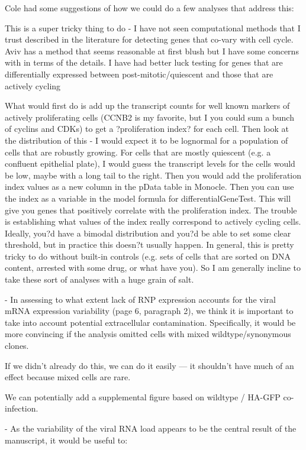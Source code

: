 \documentclass[11pt, oneside]{article}   	%
\begin{document}
{\color{red}
Cole had some suggestions of how we could do a few analyses that address this:

This is a super tricky thing to do - I have not seen computational methods that I trust described in the literature for detecting genes that co-vary with cell cycle. Aviv has a method that seems reasonable at first blush but I have some concerns with in terms of the details.
I have had better luck testing for genes that are differentially expressed between post-mitotic/quiescent and those that are actively cycling

What would first do is add up the transcript counts for well known markers of actively proliferating cells (CCNB2 is my favorite, but I you could sum a bunch of cyclins and CDKs) to get a ?proliferation index? for each cell. Then look at the distribution of this - I would expect it to be lognormal for a population of cells that are robustly growing. For cells that are mostly quiescent (e.g. a confluent epithelial plate), I would guess the transcript levels for the cells would be low, maybe with a long tail to the right. Then you would add the proliferation index values as a new column in the pData table in Monocle. Then you can use the index as a variable in the model formula for differentialGeneTest. This will give you genes that positively correlate with the proliferation index.
The trouble is establishing what values of the index really correspond to actively cycling cells. Ideally, you?d have a bimodal distribution and you?d be able to set some clear threshold, but in practice this doesn?t usually happen. In general, this is pretty tricky to do without built-in controls (e.g. sets of cells that are sorted on DNA content, arrested with some drug, or what have you).
So I am generally incline to take these sort of analyses with a huge grain of salt.
}

- In assessing to what extent lack of RNP expression accounts for the viral mRNA expression variability (page 6, paragraph 2), we think it is important to take into account potential extracellular contamination. Specifically, it would be more convincing if the analysis omitted cells with mixed wildtype/synonymous clones. 

{\color{red}
If we didn't already do this, we can do it easily --- it shouldn't have much of an effect because mixed cells are rare.

We can potentially add a supplemental figure based on wildtype / HA-GFP co-infection.
}

- As the variability of the viral RNA load appears to be the central result of the manuscript, it would be useful to: 
\end{document}
